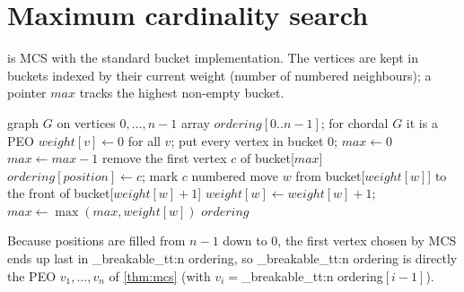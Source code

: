 \documentclass[11pt,a4paper,oneside]{report}
\theoremstyle{plain}
\theoremstyle{definition}
\theoremstyle{remark}
\DeclareRobustCommand{\code}[1]{\mtp_breakable_tt:n {#1}}
\DeclareRobustCommand{\file}[1]{\mtp_breakable_tt:n {#1}}
\begin{document}
\section{Maximum cardinality search}\label{sec:mcs-code}
 is MCS with the standard bucket implementation. The vertices are kept in buckets
indexed by their current weight (number of numbered neighbours); a pointer \(\mathit{max}\)
tracks the highest non-empty bucket.

\begin{algorithm}[ht]
\caption{Maximum cardinality search (as implemented in \file{src/mcs.cpp})}\label{alg:mcs}
\begin{algorithmic}[1]
\Require graph \(G\) on vertices \(0,\dots,n-1\)
\Ensure array \(\mathit{ordering}[0..n-1]\); for chordal \(G\) it is a PEO
\State \(\mathit{weight}[v]\gets 0\) for all \(v\); put every vertex in bucket 0; \(\mathit{max}\gets 0\)
   \(\mathit{max}\gets\mathit{max}-1\) \EndWhile
  \State remove the first vertex \(c\) of bucket[\(\mathit{max}\)]
  \State \(\mathit{ordering}[\mathit{position}]\gets c\); mark \(c\) numbered
    \State move \(w\) from bucket[\(\mathit{weight}[w]\)] to the front of bucket[\(\mathit{weight}[w]+1\)]
    \State \(\mathit{weight}[w]\gets\mathit{weight}[w]+1\); \(\mathit{max}\gets\max(\mathit{max},\mathit{weight}[w])\)
  \EndFor
\EndFor
\State \Return \(\mathit{ordering}\)
\end{algorithmic}
\end{algorithm}

Because positions are filled from \(n-1\) down to \(0\), the first vertex chosen by MCS ends
up last in \code{ordering}, so \code{ordering} is directly the PEO \(v_1,\dots,v_n\) of
\cref{thm:mcs} (with \(v_{i}={}\)\code{ordering}\([i-1]\)).
\end{document}
